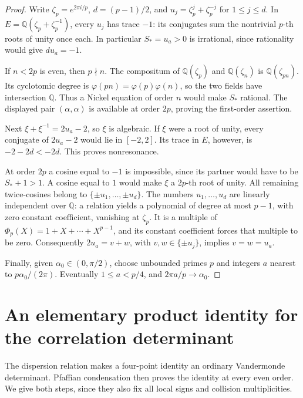 \documentclass[11pt]{article}
\numberwithin{equation}{section}
\theoremstyle{remark}\newtheorem{remark}[theorem]{Remark}
\begin{document}
\begin{proof}
Write $\zeta_p=e^{2\pi i/p}$, $d=(p-1)/2$, and
$u_j=\zeta_p^j+\zeta_p^{-j}$ for $1\leq j\leq d$. In
$E=\mathbb Q(\zeta_p+\zeta_p^{-1})$, every $u_j$ has trace $-1$:
its conjugates sum the nontrivial $p$-th roots of unity once each.
In particular $S_*=u_a>0$ is irrational, since rationality would give
$d u_a=-1$.

If $n<2p$ is even, then $p\nmid n$. The compositum of
$\mathbb Q(\zeta_p)$ and $\mathbb Q(\zeta_n)$ is
$\mathbb Q(\zeta_{pn})$. Its cyclotomic degree is
$\varphi(pn)=\varphi(p)\varphi(n)$, so the two fields have intersection
$\mathbb Q$. Thus a Nickel equation of order $n$ would make $S_*$
rational. The displayed pair $(\alpha,\alpha)$ is available at order
$2p$, proving the first-order assertion.

Next $\xi+\xi^{-1}=2u_a-2$, so $\xi$ is algebraic. If $\xi$ were a
root of unity, every conjugate of $2u_a-2$ would lie in $[-2,2]$.
Its trace in $E$, however, is $-2-2d<-2d$. This proves nonresonance.

At order $2p$ a cosine equal to $-1$ is impossible, since its partner
would have to be $S_*+1>1$. A cosine equal to $1$ would make $\xi$
a $2p$-th root of unity. All remaining twice-cosines belong to
$\{\pm u_1,\ldots,\pm u_d\}$. The numbers $u_1,\ldots,u_d$ are
linearly independent over $\mathbb Q$: a relation yields a polynomial
of degree at most $p-1$, with zero constant coefficient, vanishing at
$\zeta_p$. It is a multiple of $\Phi_p(X)=1+X+\cdots+X^{p-1}$, and
its constant coefficient forces that multiple to be zero.
Consequently $2u_a=v+w$, with $v,w\in\{\pm u_j\}$, implies
$v=w=u_a$.

Finally, given $\alpha_0\in(0,\pi/2)$, choose unbounded primes $p$
and integers $a$ nearest to $p\alpha_0/(2\pi)$. Eventually
$1\leq a<p/4$, and $2\pi a/p\to\alpha_0$.
\end{proof}

\section{An elementary product identity for the correlation determinant}
\label{sec:elementary-pfaffian}\label{sec:determinant-local}

The dispersion relation makes a four-point identity an ordinary
Vandermonde determinant.  Pfaffian condensation then proves the
identity at every even order.  We give both steps, since they also
fix all local signs and collision multiplicities.
\end{document}
